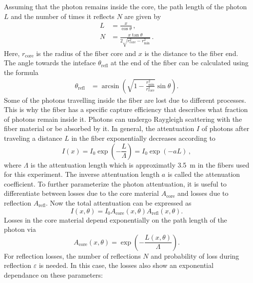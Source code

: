 Assuming that the photon remains inside the core, the path length of the photon $L$ and the number of
times it reflects $N$ are given by
\begin{align}
    L &= \frac{x}{\cos{\theta}} \, , \label{eq:L} \\ 
    N &= \frac{x \tan{\theta}}{2 \sqrt{r_\text{core}^2-r_\text{min}^2}} \, \label{eq:N} .
\end{align}
Here, $r_\text{core}$ is the radius of the fiber core and $x$ is the distance to the fiber end.
The angle towards the inteface $\theta_\text{refl}$ at the end of the fiber can be calculated using the formula
\begin{align*}
    \theta_\text{refl} &= \arcsin{\left( \sqrt{1-\frac{r_\text{min}^2}{r_\text{core}^2}} \sin{\theta} \right)} .
\end{align*}
Some of the photons travelling inside the fiber are lost due to different processes. This is why
the fiber has a specific capture efficiency that describes what fraction of photons remain inside it.
Photons can undergo Raygleigh scattering with the fiber material or be absorbed by it. In general, the attentuation $I$
of photons after traveling a distance $L$ in the fiber exponentially decreases according to
\begin{equation}
    I(x) = I_0 \exp{\left(-\frac{L}{\Lambda}\right)} = I_0 \exp{\left(- a L \right)} \, ,
    \label{eq:intensity}
\end{equation}
where $\Lambda$ is the attentuation length which is approximatly \qty{3.5}{\metre} in the fibers used for this experiment.
The inverse attentuation length $a$ is called the attenuation coefficient.
To further parameterize the photon attentuation, it is useful to differentiate between losses due to the core material
$A_\text{core}$ and losses due to reflection $A_\text{refl}$. Now the total attentuation can be expressed as
\begin{equation}
    I(x, \theta) = I_0 A_\text{core}(x, \theta) A_\text{refl}(x, \theta) .
    \label{eq:I}
\end{equation}
Losses in the core material depend exponentially on the path length of the photon via
\begin{equation}
    A_\text{core}(x, \theta) = \exp{\left(-\frac{L(x, \theta)}{\Lambda}\right)} .
    \label{eq:core}
\end{equation}
For reflection losses, the number of reflections $N$ and probability of loss during reflection $\varepsilon$ is needed.
In this case, the losses also show an exponential dependance on these parameters:
